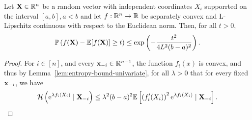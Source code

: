\begin{theorem}\label{thm:tail-bound-lipschitz}
	Let \(\mathbf{X}\in\mathbb{R}^{n}\) be a random vector with independent coordinates \(X_{i}\) supporrted on the interval \([a,b], a<b\) and let \(f:\mathbb{R}^{n}\to\mathbb{R}\) be separately convex and L-Lipschitz continuous with respect to the Euclidean norm. Then, for all \(t>0\),
	\begin{equation}
		\mathbb{P}\left(f(\mathbf{X})-\mathbb{E}[f(\mathbf{X})]\geq t\right)\leq\exp\left(-\frac{t^2}{4L^2(b-a)^2}\right).
	\end{equation}
\end{theorem}

\begin{proof}
	For \(i\in[n]\), and every \(\mathbf{x}_{-i}\in\mathbb{R}^{n-1}\), the function \(f_{i}(x)\) is convex, and thus by Lemma~\ref{lem:entropy-bound-univariate}, for all \(\lambda>0\) that for every fixed \(\mathbf{x}_{-i}\), we have
	\begin{equation*}
		\mathcal{H}\left(\mathrm{e}^{\lambda f_{i}(X_{i})}\mid\mathbf{X}_{-i}\right)\leq\lambda^2(b-a)^2\mathbb{E}\left[\left(f_{i}^{\prime}(X_{i})\right)^2\mathrm{e}^{\lambda f_{i}(X_{i})}\mid\mathbf{X}_{-i}\right].
	\end{equation*}

\end{proof}

